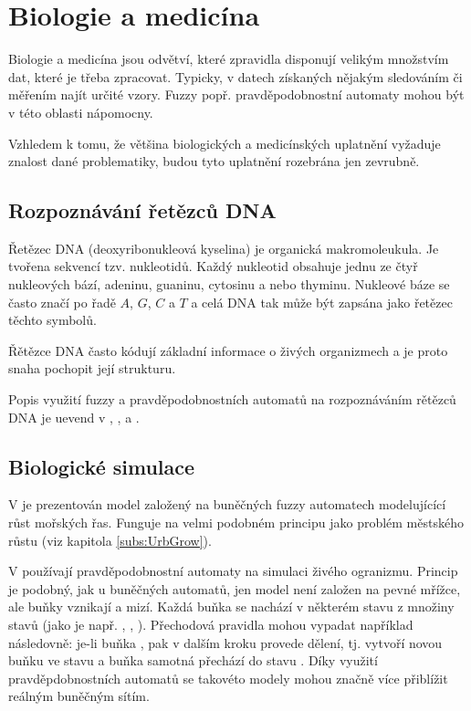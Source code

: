 \documentclass[a4paper,10pt]{article}
\begin{document}
\section{Biologie a medicína}

Biologie a medicína jsou odvětví, které zpravidla disponují velikým množstvím dat, které je třeba zpracovat. Typicky, v datech získaných nějakým sledováním či měřením najít určité vzory. Fuzzy popř. pravděpodobnostní automaty mohou být v této oblasti nápomocny.

Vzhledem k tomu, že většina biologických a medicínských uplatnění vyžaduje znalost dané problematiky, budou tyto uplatnění rozebrána jen zevrubně.

\subsection{Rozpoznávání řetězců DNA} \label{subs:DNA}
Řetězec DNA (deoxyribonukleová kyselina) je organická makromoleukula. Je tvořena sekvencí tzv. nukleotidů. Každý nukleotid obsahuje jednu ze čtyř nukleových bází, adeninu, guaninu, cytosinu a nebo thyminu. Nukleové báze se často značí po řadě $A$, $G$, $C$ a $T$ a celá DNA tak může být zapsána jako řetězec těchto symbolů.

Řětězce DNA často kódují základní informace o živých organizmech a je proto snaha pochopit její strukturu. 

Popis využití fuzzy a pravděpodobnostních automatů na rozpoznáváním rětězců DNA je uevend v \cite{SnaKepAbrHas-AproxStriMatchFuzzAut}, \cite{Ron-AutLeaApp}, \cite{ZlaSteSch-FiStaConTraFemPro} a \cite{Her-ProAriAutAppSoComFraBioSeqAna}.

\subsection{Biologické simulace}
V \cite{CheMyn-ModAlgBloDutCosWat+} je prezentován model založený na buněčných fuzzy automatech modelujícící růst mořských řas. Funguje na velmi podobném principu jako problém městského růstu (viz kapitola \ref{subs:UrbGrow}).

V \cite{MilAtl-ProAuModEpiCelNet} používají pravděpodobnostní automaty na simulaci živého ogranizmu. Princip je podobný, jak u buněčných automatů, jen model není založen na pevné mřížce, ale buňky vznikají a mizí. Každá buňka se nachází v některém stavu z množiny stavů (jako je např. , , ). Přechodová pravidla mohou vypadat například následovně: je-li buňka , pak v dalším kroku provede dělení, tj. vytvoří novou buňku ve stavu  a buňka samotná přechází do stavu . Díky využití pravděpdobnostních automatů se takovéto modely mohou značně více přiblížit reálným buněčným sítím.
\end{document}
